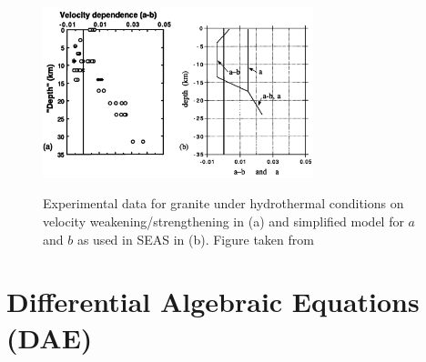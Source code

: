 \begin{figure}[H]
	\centering
	\includegraphics[width=0.7\textwidth]{images/ParametersAandBExperimental.png}
	\label{fig:DependencyParametersAandB}
	\caption{Experimental data for granite under hydrothermal conditions on velocity weakening/strengthening in (a) and simplified model for $a$ and $b$ as used in SEAS in (b). Figure taken from \cite{GeneralSEASSimulations}}
\end{figure}




\section{Differential Algebraic Equations (DAE)}

